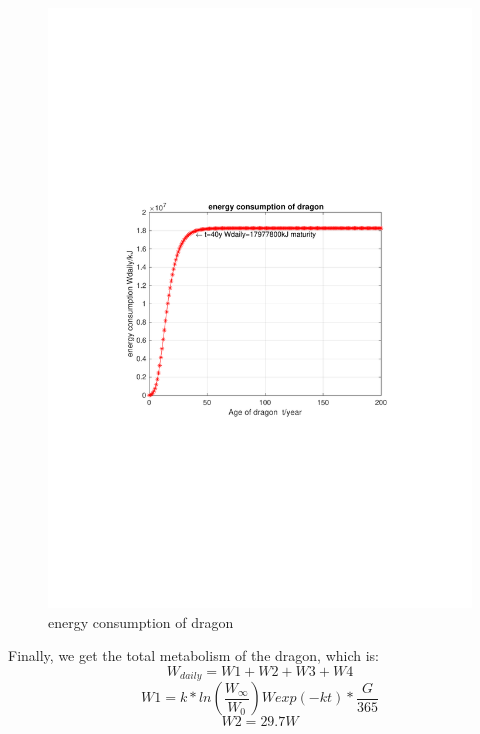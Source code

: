 \documentclass[12pt]{article}  %
\newenvironment{shrinkeq}[1]
{ \bgroup
	\addtolength\abovedisplayshortskip{#1}
	\addtolength\abovedisplayskip{#1}
	\addtolength\belowdisplayshortskip{#1}
	\addtolength\belowdisplayskip{#1}}
{\egroup\ignorespacesafterend}
\begin{document}
\begin{figure}[h]
\begin{minipage}[t]{0.45\textwidth}
		\includegraphics[width=1.05\textwidth]{easymcm/img/energy consumption of dragon.pdf}
		\caption{energy consumption of dragon}
	\end{minipage}
\end{figure}
Finally, we get the total metabolism of the dragon, which is:
\begin{shrinkeq}{-1ex}
	\begin{equation}
    \label{eq:eq14}
	   W_{daily} = W1+W2+W3+W4
	\end{equation}
\end{shrinkeq}
\begin{shrinkeq}{-1ex}
	\begin{equation}
    \label{eq:eq14}
	   W1 = k*ln(\frac{W_\infty}{W_0})W exp(-kt)*\frac{G}{365}
	\end{equation}
\end{shrinkeq}
\begin{shrinkeq}{-1ex}
	\begin{equation}
    \label{eq:eq14}
	   W2 = 29.7W
	\end{equation}
\end{shrinkeq}
\end{document}
